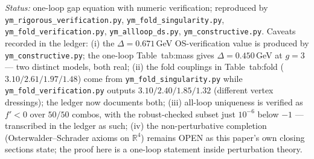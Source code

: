 \documentclass[11pt]{article}
\theoremstyle{definition}
\theoremstyle{remark}
\begin{document}
{\small
\emph{Status:} one-loop gap equation with numeric verification; reproduced
by \texttt{ym\_rigorous\_verification.py}, \texttt{ym\_fold\_singularity.py},
\texttt{ym\_fold\_verification.py}, \texttt{ym\_allloop\_ds.py},
\texttt{ym\_constructive.py}.  Caveats recorded in the ledger:
(i) the $\Delta=0.671$\,GeV OS-verification value is produced by
\texttt{ym\_constructive.py}; the one-loop Table~tab:mass gives
$\Delta=0.450$\,GeV at $g=3$ --- two distinct models, both real;
(ii) the fold couplings in Table~tab:fold
($3.10/2.61/1.97/1.48$) come from \texttt{ym\_fold\_singularity.py} while
\texttt{ym\_fold\_verification.py} outputs $3.10/2.40/1.85/1.32$ (different
vertex dressings); the ledger now documents both; (iii) all-loop uniqueness
is verified as $f'<0$ over $50/50$ combos, with the robust-checked subset
just $10^{-6}$ below $-1$ --- transcribed in the ledger as such;
(iv) the non-perturbative completion (Osterwalder--Schrader axioms on
$\mathbb{R}^4$) remains OPEN as this paper's own closing sections state;
the proof here is a one-loop statement inside perturbation theory.}
\end{document}
